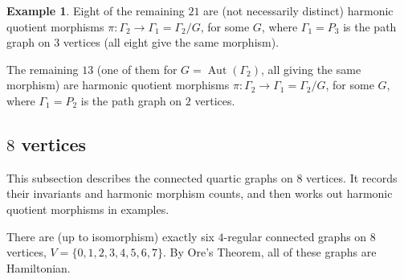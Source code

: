 \documentclass[12pt,letterpaper]{article}
\theoremstyle{definition}
\newtheorem{example}[theorem]{Example}
\DeclareMathOperator{\Aut}{Aut}
\begin{document}
\begin{example}
{Eight of the remaining $21$ are (not necessarily distinct)
harmonic quotient morphisms
$\pi: \Gamma_2\to \Gamma_1=\Gamma_2/G$,
for some $G$, where $\Gamma_1=P_3$ is the path graph on $3$ vertices (all eight give the same morphism).

The remaining $13$ (one of them for $G=\Aut(\Gamma_2)$, all giving the same morphism) are
harmonic quotient morphisms
$\pi: \Gamma_2\to \Gamma_1=\Gamma_2/G$,
for some $G$, where $\Gamma_1=P_2$ is the path graph on $2$ vertices.

}
\end{example}
  

  
\subsection{\texorpdfstring{$8$}{8} vertices}
\label{sec:d4reg8}

This subsection describes the connected quartic graphs on $8$ vertices.
It records their invariants and harmonic morphism counts, and then
works out harmonic quotient morphisms in examples.


There are (up to isomorphism) exactly six $4$-regular connected
graphs on $8$ vertices, $V=\{0,1,2,3,4,5,6,7\}$.
By Ore's Theorem, all of these graphs are Hamiltonian.
\end{document}
